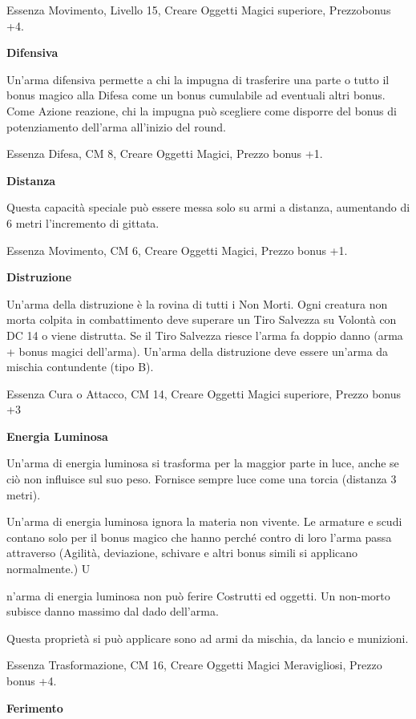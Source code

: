 \documentclass[a4paper,11pt,twoside,openany]{book}
\begin{document}
Essenza Movimento, Livello 15, Creare Oggetti Magici superiore, Prezzobonus +4.

\textbf{Difensiva}

Un'arma difensiva permette a chi la impugna di trasferire una parte o tutto il bonus magico alla Difesa come un bonus cumulabile ad eventuali altri bonus. Come Azione reazione, chi la impugna può scegliere come disporre del bonus di potenziamento dell'arma all'inizio del round.

Essenza Difesa, CM 8, Creare Oggetti Magici, Prezzo bonus +1.

\textbf{Distanza}

Questa capacità speciale può essere messa solo su armi a distanza, aumentando di 6 metri l'incremento di gittata.

Essenza Movimento, CM 6, Creare Oggetti Magici, Prezzo bonus +1.

\textbf{Distruzione}

Un'arma della distruzione è la rovina di tutti i Non Morti. Ogni creatura non morta colpita in combattimento deve superare un Tiro Salvezza su Volontà con DC 14 o viene distrutta. Se il Tiro Salvezza riesce l'arma fa doppio danno (arma + bonus magici dell'arma). Un'arma della distruzione deve essere un'arma da mischia contundente (tipo B).

Essenza Cura o Attacco, CM 14, Creare Oggetti Magici superiore, Prezzo bonus +3

\textbf{Energia Luminosa}

Un'arma di energia luminosa si trasforma per la maggior parte in luce, anche se ciò non influisce sul suo peso. Fornisce sempre luce come una torcia (distanza 3 metri).

Un'arma di energia luminosa ignora la materia non vivente. Le armature e scudi contano solo per il bonus magico che hanno perché contro di loro l'arma passa attraverso (Agilità, deviazione, schivare e altri bonus simili si applicano normalmente.) U

n'arma di energia luminosa non può ferire Costrutti ed oggetti. Un non-morto subisce danno massimo dal dado dell'arma.

Questa proprietà si può applicare sono ad armi da mischia, da lancio e munizioni.

Essenza Trasformazione, CM 16, Creare Oggetti Magici Meravigliosi, Prezzo bonus +4.

\textbf{Ferimento}
\end{document}
